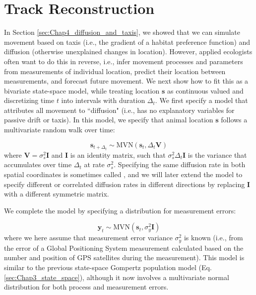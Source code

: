 \section{Track Reconstruction} \label{sec:Chap4_track_reconstruction}

In Section \ref{sec:Chap4_diffusion_and_taxis}, we showed that we can simulate movement based on taxis (i.e., the gradient of a habitat preference function) and diffusion (otherwise unexplained changes in location).  However, applied ecologists often want to do this in reverse, i.e., infer movement processes and parameters from measurements of individual location, predict their location between measurements, and forecast future movement.  We next show how to fit this as a bivariate state-space model, while treating location \(\mathbf{s}\) as continuous valued and discretizing time \(t\) into intervals with duration \(\Delta_t\).  We first specify a model that attributes all movement to ``diffusion" (i.e., has no explanatory variables for passive drift or taxis).  In this model, we specify that animal location \(\mathbf{s}\) follows a multivariate random walk over time:

\begin{equation} \label{eq:Chap4_diffusive_movement}
    \mathbf{s}_{t+\Delta_t} \sim \mathrm{MVN}( \mathbf{s}_t, \Delta_t \mathbf{V})    
\end{equation}
where \(\mathbf{V} = \sigma_s^2 \mathbf{I}\) and \(\mathbf{I}\) is an identity matrix, such that \( \sigma_s^2 \Delta_t \mathbf{I} \) is the variance that accumulates over time \(\Delta_t\) at rate \(\sigma_s^2\).  Specifying the same diffusion rate in both spatial coordinates is sometimes called , and we will later extend the model to specify different or correlated diffusion rates in different directions by replacing \(\mathbf{I}\) with a different symmetric matrix.  

We complete the model by specifying a distribution for measurement errors:

\begin{equation} \label{eq:Chap4_measurement_distribution}
    \mathbf{y}_t \sim \mathrm{MVN}( \mathbf{s}_t, \sigma_y^2 \mathbf{I})    
\end{equation}
where we here assume that measurement error variance \( \sigma_y^2\) is known (i.e., from the error of a Global Positioning System measurement calculated based on the number and position of GPS satellites during the measurement). This model is similar to the previous state-space Gompertz population model (Eq. \ref{sec:Chap3_state_space}), although it now involves a multivariate normal distribution for both process and measurement errors.

